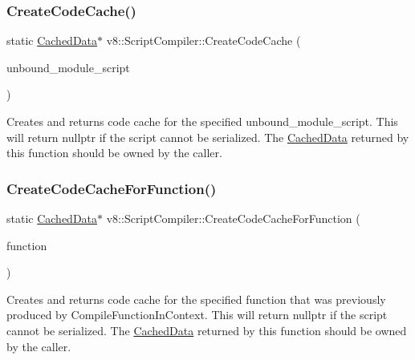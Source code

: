 \subsubsection{\texorpdfstring{Create\+Code\+Cache()}{CreateCodeCache()}\hspace{0.1cm}{\footnotesize\ttfamily [2/2]}}
{\footnotesize\ttfamily static \mbox{\hyperlink{structv8_1_1ScriptCompiler_1_1CachedData}{Cached\+Data}}$\ast$ v8\+::\+Script\+Compiler\+::\+Create\+Code\+Cache (\begin{DoxyParamCaption}\item[{\mbox{\hyperlink{classv8_1_1Local}{Local}}$<$ \mbox{\hyperlink{classv8_1_1UnboundModuleScript}{Unbound\+Module\+Script}} $>$}]{unbound\+\_\+module\+\_\+script }\end{DoxyParamCaption})\hspace{0.3cm}{\ttfamily [static]}}

Creates and returns code cache for the specified unbound\+\_\+module\+\_\+script. This will return nullptr if the script cannot be serialized. The \mbox{\hyperlink{structv8_1_1ScriptCompiler_1_1CachedData}{Cached\+Data}} returned by this function should be owned by the caller. \mbox{\label{classv8_1_1ScriptCompiler_a558a38d3be1394c153dc45e1eb059aa7}} 
\subsubsection{\texorpdfstring{Create\+Code\+Cache\+For\+Function()}{CreateCodeCacheForFunction()}}
{\footnotesize\ttfamily static \mbox{\hyperlink{structv8_1_1ScriptCompiler_1_1CachedData}{Cached\+Data}}$\ast$ v8\+::\+Script\+Compiler\+::\+Create\+Code\+Cache\+For\+Function (\begin{DoxyParamCaption}\item[{\mbox{\hyperlink{classv8_1_1Local}{Local}}$<$ \mbox{\hyperlink{classv8_1_1Function}{Function}} $>$}]{function }\end{DoxyParamCaption})\hspace{0.3cm}{\ttfamily [static]}}

Creates and returns code cache for the specified function that was previously produced by Compile\+Function\+In\+Context. This will return nullptr if the script cannot be serialized. The \mbox{\hyperlink{structv8_1_1ScriptCompiler_1_1CachedData}{Cached\+Data}} returned by this function should be owned by the caller. \mbox{\label{classv8_1_1ScriptCompiler_a406bb44ef02d644d94bccd3f7b04f2d4}} 
